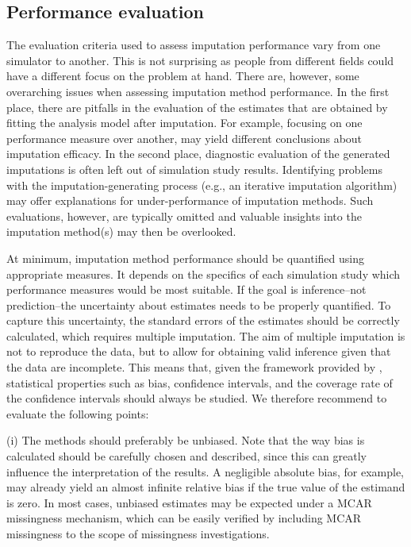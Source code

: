 \documentclass[bimj,fleqn]{w-art}
\begin{document}
\subsection{Performance evaluation}
The evaluation criteria used to assess imputation performance vary from one simulator to another. This is not surprising as people from different fields could have a different focus on the problem at hand. There are, however, some overarching issues when assessing imputation method performance. In the first place, there are pitfalls in the evaluation of the estimates that are obtained by fitting the analysis model after imputation. For example, focusing on one performance measure over another, may yield different conclusions about imputation efficacy. In the second place, diagnostic evaluation of the generated imputations is often left out of simulation study results. Identifying problems with the imputation-generating process (e.g., an iterative imputation algorithm) may offer explanations for under-performance of imputation methods. Such evaluations, however, are typically omitted and valuable insights into the imputation method(s) may then be overlooked. 

At minimum, imputation method performance should be quantified using appropriate measures. It depends on the specifics of each simulation study which performance measures would be most suitable. If the goal is inference--not prediction--the uncertainty about estimates needs to be properly quantified. To capture this uncertainty, the standard errors of the estimates should be correctly calculated, which requires multiple imputation. The aim of multiple imputation is not to reproduce the data, but to allow for obtaining valid inference given that the data are incomplete. This means that, given the framework provided by \citet{rubi87}, statistical properties such as bias, confidence intervals, and the coverage rate of the confidence intervals should always be studied. We therefore recommend to evaluate the following points:

(i) The methods should preferably be unbiased. Note that the way bias is calculated should be carefully chosen and described, since this can greatly influence the interpretation of the results. A negligible absolute bias, for example, may already yield an almost infinite relative bias if the true value of the estimand is zero. In most cases, unbiased estimates may be expected under a MCAR missingness mechanism, which can be easily verified by including MCAR missingness to the scope of missingness investigations.
\end{document}
